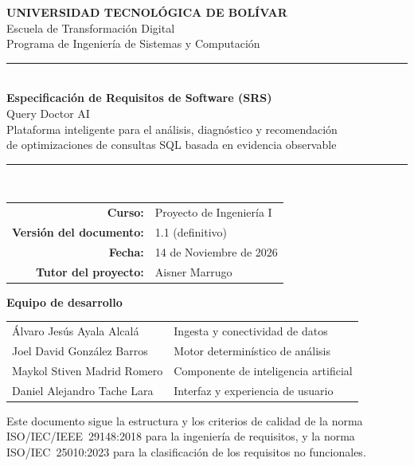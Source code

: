 \documentclass[11pt,a4paper]{report}
\begin{document}
\begin{titlepage}
\centering
\vspace*{1.5cm}

{\Large\bfseries UNIVERSIDAD TECNOL\'OGICA DE BOL\'IVAR}\\[0.3cm]
{\large Escuela de Transformación Digital}\\[0.2cm]
{\large Programa de Ingenier\'ia de Sistemas y Computaci\'on}\\[1.5cm]

\rule{0.8\linewidth}{0.4pt}\\[0.6cm]
{\Huge\bfseries Especificaci\'on de Requisitos de Software (SRS)}\\[0.5cm]
{\LARGE Query Doctor AI}\\[0.3cm]
{\large Plataforma inteligente para el an\'alisis, diagn\'ostico y recomendaci\'on\\
de optimizaciones de consultas SQL basada en evidencia observable}\\[0.6cm]
\rule{0.8\linewidth}{0.4pt}\\[2cm]

\begin{tabular}{rl}
\textbf{Curso:} & Proyecto de Ingenier\'ia I \\
\textbf{Versi\'on del documento:} & 1.1 (definitivo) \\
\textbf{Fecha:} & 14 de Noviembre de 2026 \\
\textbf{Tutor del proyecto:} & Aisner Marrugo \\
\end{tabular}

\vspace{1.2cm}
{\large\textbf{Equipo de desarrollo}}\\[0.4cm]
\begin{tabular}{ll}
\'Alvaro Jes\'us Ayala Alcal\'a & Ingesta y conectividad de datos \\
Joel David Gonz\'alez Barros & Motor determin\'istico de an\'alisis \\
Maykol Stiven Madrid Romero & Componente de inteligencia artificial \\
Daniel Alejandro Tache Lara & Interfaz y experiencia de usuario \\
\end{tabular}

\vfill
{\small Este documento sigue la estructura y los criterios de calidad de la norma ISO/IEC/IEEE~29148:2018 para la ingenier\'ia de requisitos, y la norma ISO/IEC~25010:2023 para la clasificaci\'on de los requisitos no funcionales.}
\end{titlepage}
\end{document}

